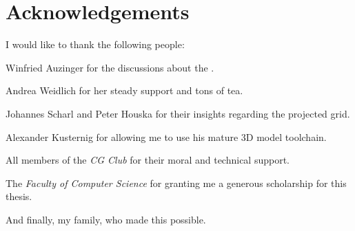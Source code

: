 \chapter*{Acknowledgements}

I would like to thank the following people:\bigskip

Winfried Auzinger for the discussions about the \FourierTransform.\bigskip

Andrea Weidlich for her steady support and tons of tea.\bigskip

Johannes Scharl and Peter Houska for their insights regarding the projected
grid.\bigskip

Alexander Kusternig for allowing me to use his mature 3D model
toolchain.\bigskip

All members of the \textit{CG Club} for their moral and technical
support.\bigskip

The \textit{Faculty of Computer Science} for granting me a generous scholarship
for this thesis.\bigskip

And finally, my family, who made this possible.\bigskip
